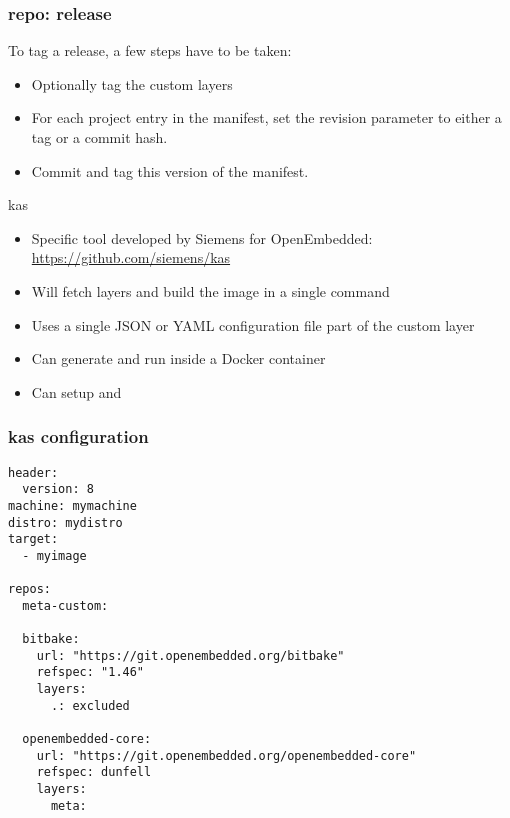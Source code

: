 \begin{frame}[fragile]
  \frametitle{repo: release}
  To tag a release, a few steps have to be taken:
  \begin{itemize}
  \item Optionally tag the custom layers
  \item For each project entry in the manifest, set the revision
    parameter to either a tag or a commit hash.
  \item Commit and tag this version of the manifest.
  \end{itemize}
\end{frame}

\begin{frame}[fragile]{kas}
  \begin{itemize}
  \item Specific tool developed by Siemens for OpenEmbedded:
    \url{https://github.com/siemens/kas}
  \item Will fetch layers and build the image in a single command
  \item Uses a single JSON or YAML configuration file part of the
    custom layer
  \item Can generate and run inside a Docker container
  \item Can setup  and 
  \end{itemize}
\end{frame}

\begin{frame}[fragile]
  \frametitle{kas configuration}
  \begin{block}{}
  \fontsize{9}{9}\selectfont
  \begin{verbatim}
header:
  version: 8
machine: mymachine
distro: mydistro
target:
  - myimage

repos:
  meta-custom:

  bitbake:
    url: "https://git.openembedded.org/bitbake"
    refspec: "1.46"
    layers:
      .: excluded

  openembedded-core:
    url: "https://git.openembedded.org/openembedded-core"
    refspec: dunfell
    layers:
      meta:
  \end{verbatim}
  \end{block}
\end{frame}

